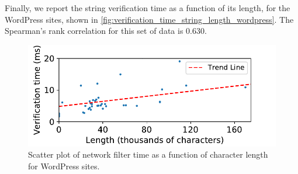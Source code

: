 Finally, we report the string verification time as a function of its length, for the WordPress sites, shown in \autoref{fig:verification_time_string_length_wordpress}. The Spearman's rank correlation for this set of data is 0.630.


\begin{figure}[h]
	\begin{center}
	\includegraphics[scale=0.55]{results/string_length_vs_verification_time_wordpress_small.pdf}
	
	\caption{Scatter plot of network filter time as a function of character length for WordPress sites.}
	\label{fig:verification_time_string_length_wordpress}
\end{center}
\end{figure}





